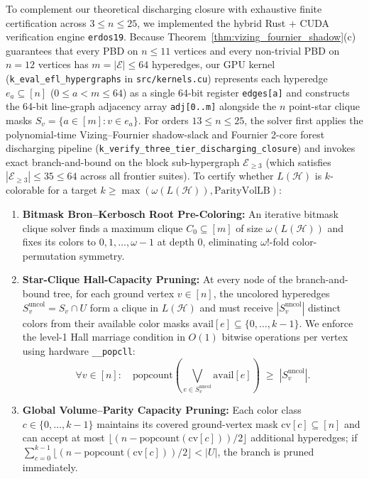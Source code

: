 \documentclass[11pt,reqno]{amsart}
\theoremstyle{definition}
\theoremstyle{remark}
\begin{document}
To complement our theoretical discharging closure with exhaustive finite certification across $3 \le n \le 25$, we implemented the hybrid Rust + CUDA verification engine \texttt{erdos19}. Because Theorem~\ref{thm:vizing_fournier_shadow}(c) guarantees that every PBD on $n \le 11$ vertices and every non-trivial PBD on $n = 12$ vertices has $m = |\mathcal{E}| \le 64$ hyperedges, our GPU kernel (\texttt{k\_eval\_efl\_hypergraphs} in \texttt{src/kernels.cu}) represents each hyperedge $e_a \subseteq [n]$ ($0 \le a < m \le 64$) as a single 64-bit register \texttt{edges[a]} and constructs the 64-bit line-graph adjacency array \texttt{adj[0..m]} alongside the $n$ point-star clique masks $S_v = \{a \in [m] : v \in e_a\}$. For orders $13 \le n \le 25$, the solver first applies the polynomial-time Vizing--Fournier shadow-slack and Fournier 2-core forest discharging pipeline (\texttt{k\_verify\_three\_tier\_discharging\_closure}) and invokes exact branch-and-bound on the block sub-hypergraph $\mathcal{E}_{\ge 3}$ (which satisfies $|\mathcal{E}_{\ge 3}| \le 35 \le 64$ across all frontier suites). To certify whether $L(\mathcal{H})$ is $k$-colorable for a target $k \ge \max(\omega(L(\mathcal{H})), \text{ParityVolLB})$:
\begin{enumerate}
  \item \textbf{Bitmask Bron--Kerbosch Root Pre-Coloring:} An iterative bitmask clique solver finds a maximum clique $C_0 \subseteq [m]$ of size $\omega(L(\mathcal{H}))$ and fixes its colors to $0, 1, \dots, \omega - 1$ at depth $0$, eliminating $\omega!$-fold color-permutation symmetry.
  \item \textbf{Star-Clique Hall-Capacity Pruning:} At every node of the branch-and-bound tree, for each ground vertex $v \in [n]$, the uncolored hyperedges $S_v^{\mathrm{uncol}} = S_v \cap U$ form a clique in $L(\mathcal{H})$ and must receive $|S_v^{\mathrm{uncol}}|$ distinct colors from their available color masks $\mathrm{avail}[e] \subseteq \{0, \dots, k-1\}$. We enforce the level-1 Hall marriage condition in $O(1)$ bitwise operations per vertex using hardware \texttt{\_\_popcll}:
  \begin{equation}\label{eq:hall_prune}
    \forall v \in [n]: \quad \mathrm{popcount}\!\left( \bigvee_{e \in S_v^{\mathrm{uncol}}} \mathrm{avail}[e] \right) \;\ge\; |S_v^{\mathrm{uncol}}|.
  \end{equation}
  \item \textbf{Global Volume--Parity Capacity Pruning:} Each color class $c \in \{0, \dots, k-1\}$ maintains its covered ground-vertex mask $\mathrm{cv}[c] \subseteq [n]$ and can accept at most $\lfloor (n - \mathrm{popcount}(\mathrm{cv}[c]))/2 \rfloor$ additional hyperedges; if $\sum_{c=0}^{k-1} \lfloor (n - \mathrm{popcount}(\mathrm{cv}[c]))/2 \rfloor < |U|$, the branch is pruned immediately.
\end{enumerate}
\end{document}
